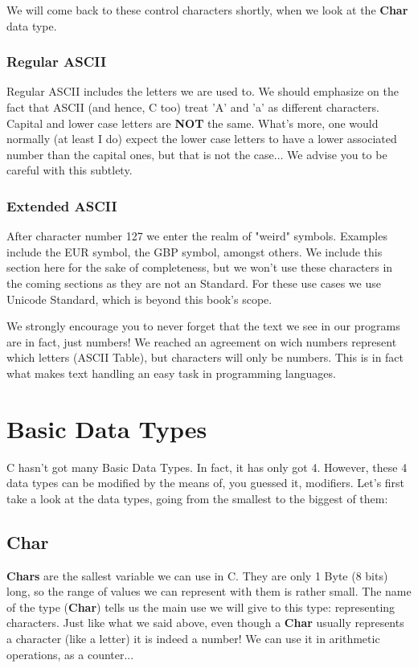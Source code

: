 \documentclass[12pt]{book}
\begin{document}
We will come back to these control characters shortly, when we look at the \textbf{Char} data type.

\subsubsection{Regular ASCII}

Regular ASCII includes the letters we are used to. We should emphasize on the fact that ASCII (and hence, C too) treat 'A' and 'a' as different characters. Capital and lower case letters are \textbf{NOT} the same. What's more, one would normally (at least I do) expect the lower case letters to have a lower associated number than the capital ones, but that is not the case... We advise you to be careful with this subtlety.

\subsubsection{Extended ASCII}

After character number 127 we enter the realm of "weird" symbols. Examples include the EUR symbol, the GBP symbol, amongst others. We include this section here for the sake of completeness, but we won't use these characters in the coming sections as they are not an Standard. For these use cases we use Unicode Standard, which is beyond this book's scope.

We strongly encourage you to never forget that the text we see in our programs are in fact, just numbers! We reached an agreement on wich numbers represent which letters (ASCII Table), but characters will only be numbers. This is in fact what makes text handling an easy task in programming languages.

\section{Basic Data Types}

C hasn't got many Basic Data Types. In fact, it has only got 4. However, these 4 data types can be modified by the means of, you guessed it, modifiers. Let's first take a look at the data types, going from the smallest to the biggest of them:

\subsection{Char}
\textbf{Chars} are the sallest variable we can use in C. They are only 1 Byte (8 bits) long, so the range of values we can represent with them is rather small. The name of the type (\textbf{Char}) tells us the main use we will give to this type: representing characters. Just like what we said above, even though a \textbf{Char} usually represents a character (like a letter) it is indeed a number! We can use it in arithmetic operations, as a counter...
\end{document}

